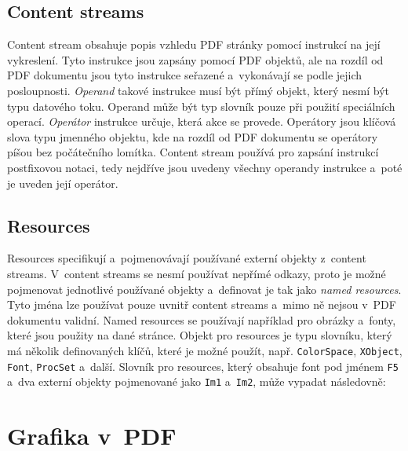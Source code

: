 \subsection*{Content streams} \label{content_streams}
Content stream obsahuje popis vzhledu PDF stránky pomocí instrukcí na její
vykreslení. Tyto instrukce jsou zapsány pomocí PDF objektů, ale na rozdíl od
PDF dokumentu jsou tyto instrukce seřazené a~vykonávají se podle jejich
posloupnosti. \emph{Operand} takové instrukce musí být přímý objekt, který 
nesmí být typu datového toku. Operand může být typ slovník pouze při použití
speciálních operací. \emph{Operátor} instrukce určuje, která akce se provede.
Operátory jsou klíčová slova typu jmenného objektu, kde na rozdíl od PDF dokumentu
se operátory píšou bez počátečního lomítka. Content stream používá pro zapsání
instrukcí postfixovou notaci, tedy nejdříve jsou uvedeny všechny operandy instrukce
a~poté je uveden její operátor.


\subsection*{Resources}
Resources specifikují a~pojmenovávají používané externí objekty z~content streams.
V~content streams se nesmí používat nepřímé odkazy, proto je možné pojmenovat
jednotlivé používané objekty a~definovat je tak jako \emph{named resources}.
Tyto jména lze používat pouze uvnitř content streams a~mimo ně nejsou v~PDF
dokumentu validní. Named resources se používají například pro obrázky a~fonty,
které jsou použity na dané stránce. Objekt pro resources je typu slovníku, který
má několik definovaných klíčů, které je možné použít, např. \texttt{ColorSpace}, 
\texttt{XObject}, \texttt{Font}, \texttt{ProcSet} a~další. Slovník pro resources,
který obsahuje font pod jménem \texttt{F5} a~dva externí objekty pojmenované jako
\texttt{Im1} a~\texttt{Im2}, může vypadat následovně:



\section{Grafika v~PDF}

